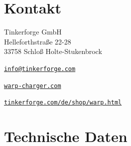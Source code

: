 \documentclass[a4paper,10pt]{article}
\begin{document}
\begin{multicols*}{2}
    \section{Kontakt}
    Tinkerforge GmbH\\ Helleforthstraße 22-28\\ 33758 Schloß Holte-Stukenbrock
    \begin{description}[leftmargin=!,labelwidth=\widthof{\textbf{Website}}]
        \item[E-Mail] \href{mailto:info@tinkerforge.com}{\texttt{info@tinkerforge.com}}
        \item[Website] \href{https://warp-charger.com}{\texttt{warp-charger.com}}
        \item[Telefon] 
        \item[Shop] \href{https://tinkerforge.com/de/shop/warp.html}{\texttt{tinkerforge.com/de/shop/warp.html}}
    \end{description}

    \vfill
    \null
    \columnbreak
    \section{Technische Daten}
    \begin{minipage}{\linewidth}


\end{minipage}
\end{multicols*}
\end{document}
